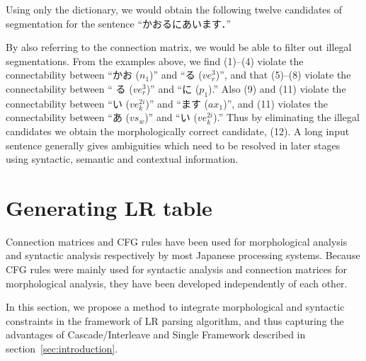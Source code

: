 Using only the dictionary, we would obtain the following twelve
candidates of segmentation for the sentence ``かおるにあいます．''
\begin{center}
  \def\arraystretch{}
  
\end{center}
By \hspace{-0.2mm}also \hspace{-0.2mm}referring \hspace{-0.2mm}to \hspace{-0.2mm}the \hspace{-0.2mm}connection \hspace{-0.2mm}matrix, \hspace{-0.2mm}we \hspace{-0.2mm}would \hspace{-0.2mm}be \hspace{-0.2mm}able \hspace{-0.2mm}to \hspace{-0.2mm}filter
\hspace{-0.2mm}out \hspace{-0.2mm}illegal \hspace{-0.2mm}segmentations. From the examples above, we find (1)--(4)
violate the connectability between ``かお ($n_1$)'' and ``る 
($ve_r^3$)'', and that (5)--(8) violate the connectability between ``
る ($ve_r^3$)'' and ``に ($p_1$).''  Also (9) and (11) violate the
connectability between ``い ($ve_k^{2i}$)'' and ``ます ($ax_1$)'', and
(11) violates the connectability between ``あ ($vs_w$)'' and ``い 
($ve_k^{2i}$).'' Thus by eliminating the illegal candidates we obtain
the morphologically correct candidate, (12). A long input sentence
generally gives ambiguities which need to be resolved in later stages
using syntactic, semantic and contextual information.

\section{Generating LR table}
\label{sec:LR-table}

Connection matrices and CFG rules have been used for morphological
analysis and syntactic analysis respectively by most Japanese
processing systems. Because CFG rules were mainly used for syntactic
analysis and connection matrices for morphological analysis, they have
been developed independently of each other. 

In this section, we propose a method to integrate morphological and
syntactic constraints in the framework of LR parsing algorithm, and
thus capturing the advantages of Cascade/Interleave and Single
Framework described in section~\ref{sec:introduction}.

